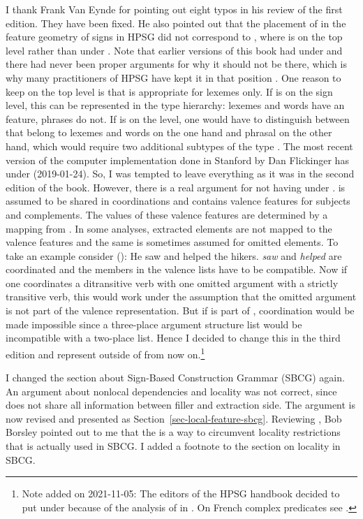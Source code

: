 I thank Frank Van Eynde for pointing out eight typos in his review of the first edition. They have
been fixed. He also pointed out that the placement of \argst in the feature geometry of signs in
HPSG did not correspond to , where \argst is on the top level rather than under
\cat. Note that earlier versions of this book had \argst under \cat and there had never been proper
arguments for why it should not be there, which is why many practitioners of HPSG have kept it in
that position \citep{MuellerLFGphrasal}. One reason to keep \argst on the top level is that \argst is appropriate
for lexemes only. If \argst is on the sign level, this can be represented in the type hierarchy:
lexemes and words have an \argst feature, phrases do not. If \argst is on the \cat level, one would
have to distinguish between \catvs that belong to lexemes and words on the one hand and phrasal
\catvs on the other hand, which would require two additional subtypes of the type . 
The most recent version of the computer implementation done in Stanford by Dan Flickinger has \argst
under \local (2019-01-24). So, I was tempted to leave everything as it was in the second edition of
the book. However, there is a real argument for not having \argst under \cat. \cat is assumed to be
shared in coordinations and \cat contains valence features for subjects and complements. The values of
these valence features are determined by a mapping from \argst. In some analyses, extracted elements
are not mapped to the valence features and the same is sometimes assumed for omitted elements. To
take an example consider ():
\ea
He saw and helped the hikers.
\z
\emph{saw} and \emph{helped} are coordinated and the members in the valence lists have to be
compatible. Now if one coordinates a ditransitive verb with one omitted argument with a strictly
transitive verb, this would work under the assumption that the omitted argument is not part of the
valence representation. But if \argst is part of \cat, coordination would be made impossible since a
three-place argument structure list would be incompatible with a two-place list. Hence I decided to
change this in the third edition and represent \argst outside of \cat from now on.\footnote{
  Note added on 2021-11-05: The editors of the HPSG handbook \citep*{HPSGHandbook} decided to put
  \argst under \cat \citep[]{Abeille:Borsley2021a} because of the analysis of  in . On French complex
  predicates see .
}

I changed the section about Sign-Based Construction Grammar (SBCG) again. An argument about nonlocal
dependencies and locality was not correct, since \citet[]{Sag2012a} does not share all
information between filler and extraction side. The argument is now revised and presented as
Section~\ref{sec-local-feature-sbcg}. Reviewing , Bob Borsley pointed out to me that the \xargf is a way to
circumvent locality restrictions that is actually used in SBCG. I added a footnote to the section on
locality in SBCG.

